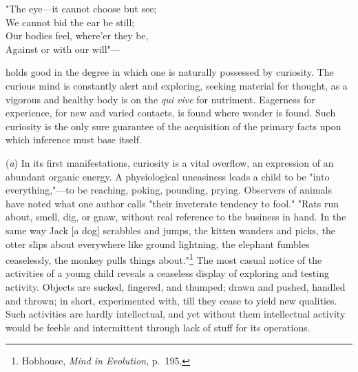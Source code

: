 \documentclass[letterpaper]{book}
\begin{document}
{"The eye---it cannot choose but see;\\
} {We cannot bid the ear be still;\\
} {Our bodies feel, where'er they be,\\
} {Against or with our will"---\\
}

holds good in the degree in which one is naturally possessed by
curiosity. The curious mind is constantly alert and exploring, seeking
material for thought, as a vigorous and healthy body is on the \emph{qui
vive} for nutriment. Eagerness for experience, for new and varied
contacts, is found where wonder is found. Such curiosity is the only
sure guarantee of the acquisition of the primary facts upon which
inference must base itself.


(\emph{a}) In its first manifestations, curiosity is a vital overflow,
an expression of an abundant organic energy. A physiological uneasiness
leads a child to be "into everything,"---to be reaching, poking,
pounding, prying. Observers of animals have noted what one author calls
"their inveterate tendency to fool." "Rats run about, smell, dig, or
gnaw, without real reference to the business in hand. In the same way
Jack {[}a dog{]} scrabbles and jumps, the kitten wanders and picks, the
otter slips about everywhere like ground lightning, the elephant fumbles
ceaselessly, the monkey pulls things
about."\footnote{Hobhouse, \emph{Mind in Evolution}, p.\ 195. }
The most casual notice of the activities of a young child reveals a
ceaseless display of exploring and testing activity. Objects are sucked,
fingered, and thumped; drawn and pushed, handled and thrown; in short,
experimented
with, till they cease to yield new qualities. Such activities are hardly
intellectual, and yet without them intellectual activity would be feeble
and intermittent through lack of stuff for its operations.

\end{document}
